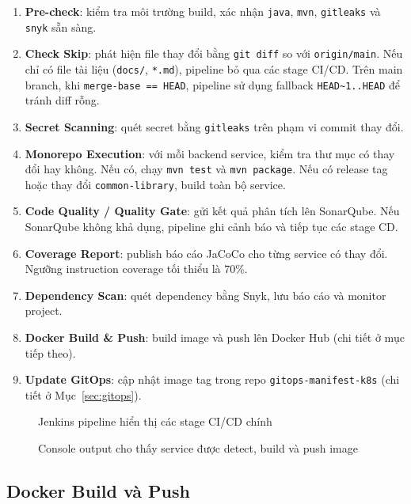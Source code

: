 \begin{enumerate}
\item \textbf{Pre-check}: kiểm tra môi trường build, xác nhận \texttt{java}, \texttt{mvn}, \texttt{gitleaks} và \texttt{snyk} sẵn sàng.
\item \textbf{Check Skip}: phát hiện file thay đổi bằng \texttt{git diff} so với \texttt{origin/main}. Nếu chỉ có file tài liệu (\texttt{docs/}, \texttt{*.md}), pipeline bỏ qua các stage CI/CD. Trên main branch, khi \texttt{merge-base == HEAD}, pipeline sử dụng fallback \texttt{HEAD\textasciitilde1..HEAD} để tránh diff rỗng.
\item \textbf{Secret Scanning}: quét secret bằng \texttt{gitleaks} trên phạm vi commit thay đổi.
\item \textbf{Monorepo Execution}: với mỗi backend service, kiểm tra thư mục có thay đổi hay không. Nếu có, chạy \texttt{mvn test} và \texttt{mvn package}. Nếu có release tag hoặc thay đổi \texttt{common-library}, build toàn bộ service.
\item \textbf{Code Quality / Quality Gate}: gửi kết quả phân tích lên SonarQube. Nếu SonarQube không khả dụng, pipeline ghi cảnh báo và tiếp tục các stage CD.
\item \textbf{Coverage Report}: publish báo cáo JaCoCo cho từng service có thay đổi. Ngưỡng instruction coverage tối thiểu là 70\%.
\item \textbf{Dependency Scan}: quét dependency bằng Snyk, lưu báo cáo và monitor project.
\item \textbf{Docker Build \& Push}: build image và push lên Docker Hub (chi tiết ở mục tiếp theo).
\item \textbf{Update GitOps}: cập nhật image tag trong repo \texttt{gitops-manifest-k8s} (chi tiết ở Mục~\ref{sec:gitops}).
\end{enumerate}

\begin{figure}[H]
\centering
{}
\caption{Jenkins pipeline hiển thị các stage CI/CD chính}
\end{figure}

\begin{figure}[H]
\centering
{}
\caption{Console output cho thấy service được detect, build và push image}
\end{figure}

\subsection{Docker Build và Push}


